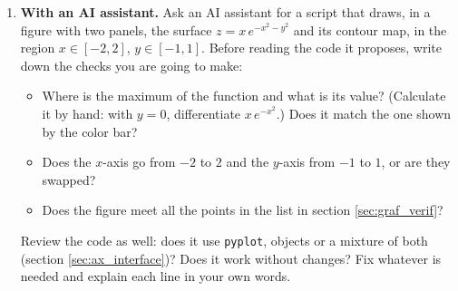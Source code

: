 \begin{enumerate}
\item \textbf{With an AI assistant.} Ask an AI assistant for a script that draws, in a figure with two panels, the surface $z=x\,e^{-x^2-y^2}$ and its contour map, in the region $x\in[-2,2]$, $y\in[-1,1]$. Before reading the code it proposes, write down the checks you are going to make:
\begin{itemize}
\item Where is the maximum of the function and what is its value? (Calculate it by hand: with $y=0$, differentiate $x\,e^{-x^2}$.) Does it match the one shown by the color bar?
\item Does the $x$-axis go from $-2$ to $2$ and the $y$-axis from $-1$ to $1$, or are they swapped?
\item Does the figure meet all the points in the list in section \ref{sec:graf_verif}?
\end{itemize}
Review the code as well: does it use \texttt{pyplot}, objects or a mixture of both (section \ref{sec:ax_interface})? Does it work without changes? Fix whatever is needed and explain each line in your own words.
\end{enumerate}

\newpage
